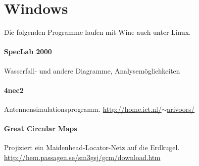 \section{Windows}
Die folgenden Programme laufen mit Wine auch unter Linux.
\paragraph{SpecLab 2000} \setcounter{fnc}{\value{footnote}} Wasserfall- und andere Diagramme, Analysemöglichkeiten

\paragraph{4nec2} Antennensimulationsprogramm. \href{http://home.ict.nl/$\sim$arivoors/}{http://home.ict.nl/$\sim$arivoors/}

\paragraph{Great Circular Maps} Projiziert ein Maidenhead-Locator-Netz auf die Erdkugel.\\ \href{http://hem.passagen.se/sm3gsj/gcm/download.htm}{http://hem.passagen.se/sm3gsj/gcm/download.htm}